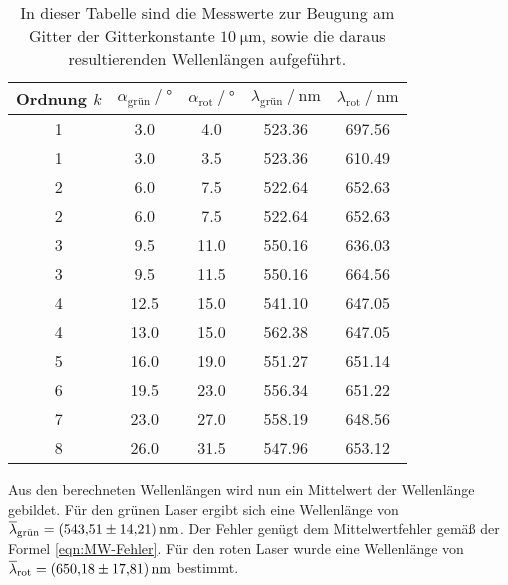 \begin{table}
  \centering
  \caption{In dieser Tabelle sind die Messwerte zur Beugung am Gitter der Gitterkonstante $\qty{10}{\micro\metre}$, sowie die daraus resultierenden Wellenlängen aufgeführt.}
  \label{tab:Beugung100}
  \begin{tabular}{c S[table-format = 2.1] S[table-format = 2.1] S[table-format = 3.2] S[table-format = 3.2]}
    \toprule
    {Ordnung $k$} & {$\alpha_{\text{grün}} \mathbin{/}\unit{\degree}$} & {$\alpha_{\text{rot}} \mathbin{/}\unit{\degree}$} & {$\lambda_{\text{grün}} \mathbin{/}\unit{\nano\metre}$} & {$\lambda_{\text{rot}} \mathbin{/}\unit{\nano\metre}$}\\
      \midrule
      
      1 &  3.0 &  4.0 & 523.36 & 697.56 \\
      1 &  3.0 &  3.5 & 523.36 & 610.49 \\
      2 &  6.0 &  7.5 & 522.64 & 652.63 \\
    	2 &  6.0 &  7.5 & 522.64 & 652.63 \\    
    	3 &  9.5 & 11.0 & 550.16 & 636.03 \\
    	3 &  9.5 & 11.5 & 550.16 & 664.56 \\
      4 & 12.5 & 15.0 & 541.10 & 647.05 \\
      4 & 13.0 & 15.0 & 562.38 & 647.05 \\
      5 & 16.0 & 19.0 & 551.27 & 651.14 \\
      6 & 19.5 & 23.0 & 556.34 & 651.22 \\
      7 & 23.0 & 27.0 & 558.19 & 648.56 \\
      8 & 26.0 & 31.5 & 547.96 & 653.12 \\
      
      \bottomrule
  \end{tabular}
\end{table}

Aus den berechneten Wellenlängen wird nun ein Mittelwert der Wellenlänge gebildet. Für den grünen Laser ergibt sich eine Wellenlänge von 
$\overline{\lambda}_{\text{grün}} = \qty{543.51 +- 14.21}{\nano\metre}$. Der Fehler genügt dem Mittelwertfehler gemäß der Formel \eqref{eqn:MW-Fehler}.
Für den roten Laser wurde eine Wellenlänge von $\overline{\lambda}_{\text{rot}} = \qty{650.18 +- 17.81}{\nano\metre}$ bestimmt.